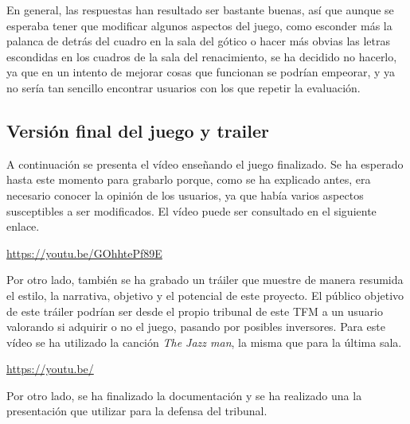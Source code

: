En general, las respuestas han resultado ser bastante buenas, así que aunque se esperaba tener que modificar algunos aspectos del juego, como esconder más la palanca de detrás del cuadro en la sala del gótico o hacer más obvias las letras escondidas en los cuadros de la sala del renacimiento, se ha decidido no hacerlo, ya que en un intento de mejorar cosas que funcionan se podrían empeorar, y ya no sería tan sencillo encontrar usuarios con los que repetir la evaluación.

\subsection{Versión final del juego y trailer}

A continuación se presenta el vídeo enseñando el juego finalizado. Se ha esperado hasta este momento para grabarlo porque, como se ha explicado antes, era necesario conocer la opinión de los usuarios, ya que había varios aspectos susceptibles a ser modificados. El vídeo puede ser consultado en el siguiente enlace.

\begin{center}
    \url{https://youtu.be/GOhhtePf89E}
\end{center}

Por otro lado, también se ha grabado un tráiler que muestre de manera resumida el estilo, la narrativa, objetivo y el potencial de este proyecto. El público objetivo de este tráiler podrían ser desde el propio tribunal de este \acs{TFM} a un usuario valorando si adquirir o no el juego, pasando por posibles inversores. Para este vídeo se ha utilizado la canción \textit{The Jazz man}, la misma que para la última sala.

\begin{center}
    \url{https://youtu.be/}
\end{center}

\bigskip

Por otro lado, se ha finalizado la documentación y se ha realizado una la presentación que utilizar para la defensa del tribunal.
